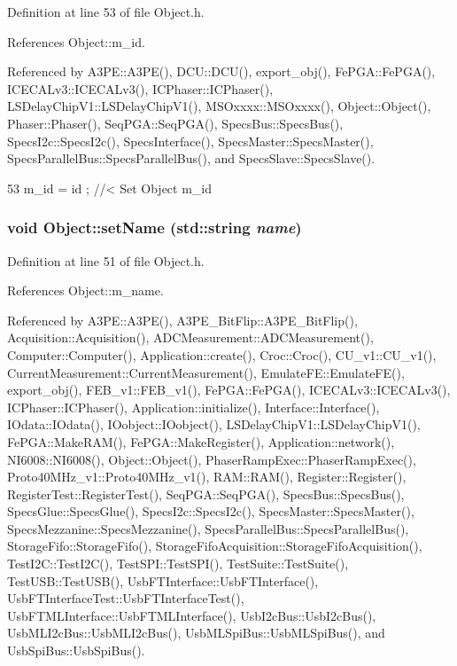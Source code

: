Definition at line 53 of file Object.h.

References Object::m\_\-id.

Referenced by A3PE::A3PE(), DCU::DCU(), export\_\-obj(), FePGA::FePGA(), ICECALv3::ICECALv3(), ICPhaser::ICPhaser(), LSDelayChipV1::LSDelayChipV1(), MSOxxxx::MSOxxxx(), Object::Object(), Phaser::Phaser(), SeqPGA::SeqPGA(), SpecsBus::SpecsBus(), SpecsI2c::SpecsI2c(), SpecsInterface(), SpecsMaster::SpecsMaster(), SpecsParallelBus::SpecsParallelBus(), and SpecsSlave::SpecsSlave().


\begin{DoxyCode}
53 { m_id    = id    ; } //< Set Object m_id
\end{DoxyCode}
\hypertarget{classObject_ae30fea75683c2d149b6b6d17c09ecd0c}{
\subsubsection[{setName}]{\setlength{\rightskip}{0pt plus 5cm}void Object::setName (std::string {\em name})}}
\label{classObject_ae30fea75683c2d149b6b6d17c09ecd0c}


Definition at line 51 of file Object.h.

References Object::m\_\-name.

Referenced by A3PE::A3PE(), A3PE\_\-BitFlip::A3PE\_\-BitFlip(), Acquisition::Acquisition(), ADCMeasurement::ADCMeasurement(), Computer::Computer(), Application::create(), Croc::Croc(), CU\_\-v1::CU\_\-v1(), CurrentMeasurement::CurrentMeasurement(), EmulateFE::EmulateFE(), export\_\-obj(), FEB\_\-v1::FEB\_\-v1(), FePGA::FePGA(), ICECALv3::ICECALv3(), ICPhaser::ICPhaser(), Application::initialize(), Interface::Interface(), IOdata::IOdata(), IOobject::IOobject(), LSDelayChipV1::LSDelayChipV1(), FePGA::MakeRAM(), FePGA::MakeRegister(), Application::network(), NI6008::NI6008(), Object::Object(), PhaserRampExec::PhaserRampExec(), Proto40MHz\_\-v1::Proto40MHz\_\-v1(), RAM::RAM(), Register::Register(), RegisterTest::RegisterTest(), SeqPGA::SeqPGA(), SpecsBus::SpecsBus(), SpecsGlue::SpecsGlue(), SpecsI2c::SpecsI2c(), SpecsMaster::SpecsMaster(), SpecsMezzanine::SpecsMezzanine(), SpecsParallelBus::SpecsParallelBus(), StorageFifo::StorageFifo(), StorageFifoAcquisition::StorageFifoAcquisition(), TestI2C::TestI2C(), TestSPI::TestSPI(), TestSuite::TestSuite(), TestUSB::TestUSB(), UsbFTInterface::UsbFTInterface(), UsbFTInterfaceTest::UsbFTInterfaceTest(), UsbFTMLInterface::UsbFTMLInterface(), UsbI2cBus::UsbI2cBus(), UsbMLI2cBus::UsbMLI2cBus(), UsbMLSpiBus::UsbMLSpiBus(), and UsbSpiBus::UsbSpiBus().


